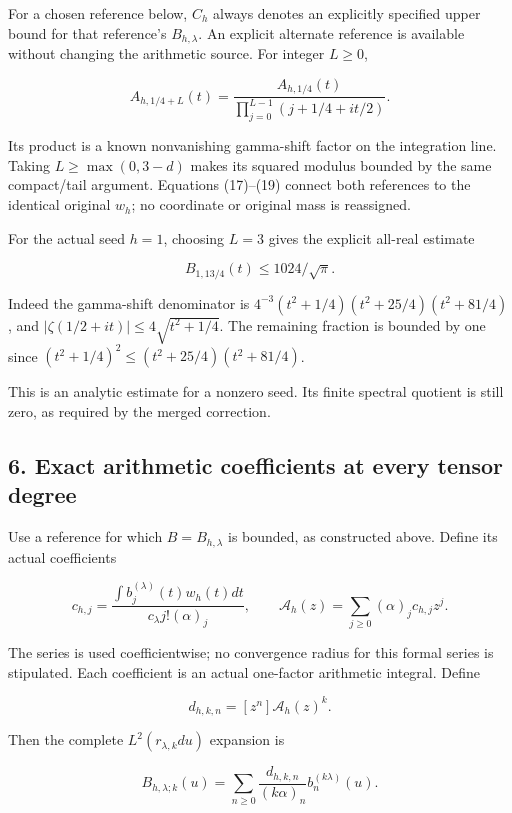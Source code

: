 For a chosen reference below, \(C_h\) always denotes an explicitly specified upper bound for that
reference's \(B_{h,\lambda}\). An explicit alternate reference is available without changing the
arithmetic source. For integer \(L\ge0\),

\[
A_{h,1/4+L}(t)
=\frac{A_{h,1/4}(t)}{\prod_{j=0}^{L-1}(j+1/4+it/2)}.                \tag{22}
\]

Its product is a known nonvanishing gamma-shift factor on the integration line. Taking
\(L\ge\max(0,3-d)\) makes its squared modulus bounded by the same compact/tail argument. Equations
(17)--(19) connect both references to the identical original \(w_h\); no coordinate or original mass
is reassigned.

For the actual seed \(h=1\), choosing \(L=3\) gives the explicit all-real estimate

\[
\boxed{
B_{1,13/4}(t)\le1024/\sqrt\pi.
}                                                                   \tag{23}
\]

Indeed the gamma-shift denominator is \(4^{-3}(t^2+1/4)(t^2+25/4)(t^2+81/4)\), and
\(|\zeta(1/2+it)|\le4\sqrt{t^2+1/4}\). The remaining fraction is bounded by one since
\((t^2+1/4)^2\le(t^2+25/4)(t^2+81/4)\).

This is an analytic estimate for a nonzero seed. Its finite spectral quotient is still zero, as
required by the merged correction.

\subsection{6. Exact arithmetic coefficients at every tensor
degree}\label{gamma_convolution:exact-arithmetic-coefficients-at-every-tensor-degree}

Use a reference for which \(B=B_{h,\lambda}\) is bounded, as constructed above. Define its actual
coefficients

\[
c_{h,j}=\frac{\int b_j^{(\lambda)}(t)w_h(t)dt}
                 {c_\lambda j!(\alpha)_j},\qquad
\mathcal A_h(z)=\sum_{j\ge0}(\alpha)_j c_{h,j}z^j.                  \tag{24}
\]

The series is used coefficientwise; no convergence radius for this formal series is stipulated. Each
coefficient is an actual one-factor arithmetic integral. Define

\[
d_{h,k,n}=[z^n]\mathcal A_h(z)^k.
\]

Then the complete \(L^2(r_{\lambda,k}du)\) expansion is

\[
\boxed{
B_{h,\lambda;k}(u)
=\sum_{n\ge0}\frac{d_{h,k,n}}{(k\alpha)_n}
                                     b_n^{(k\lambda)}(u).
}                                                                   \tag{25}
\]

